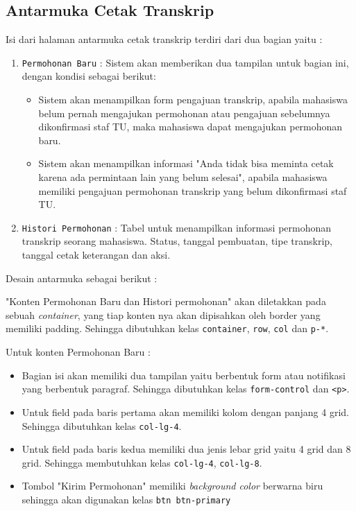 \subsection{Antarmuka Cetak Transkrip}
Isi dari halaman antarmuka cetak transkrip terdiri dari dua bagian yaitu :
\begin{enumerate}
	\item \verb|Permohonan Baru| : Sistem akan memberikan dua tampilan untuk bagian ini, dengan kondisi sebagai berikut:
	\begin{itemize}
		\item Sistem akan menampilkan form pengajuan transkrip, apabila mahasiswa belum pernah mengajukan permohonan atau pengajuan sebelumnya  dikonfirmasi staf TU, maka mahasiswa dapat mengajukan permohonan baru.
		\item Sistem akan menampilkan informasi "Anda tidak bisa meminta cetak karena ada permintaan lain yang belum selesai", apabila mahasiswa memiliki pengajuan permohonan transkrip yang belum dikonfirmasi staf TU. 
	\end{itemize}
	\item \verb|Histori Permohonan| : Tabel untuk menampilkan informasi permohonan transkrip seorang mahasiswa. Status, tanggal pembuatan, tipe transkrip, tanggal cetak keterangan dan aksi. 
\end{enumerate}
Desain antarmuka sebagai berikut : \par
"Konten Permohonan Baru dan Histori permohonan" akan diletakkan pada sebuah \textit{container}, yang tiap konten nya akan dipisahkan oleh border yang memiliki padding. Sehingga dibutuhkan kelas \verb|container|, \verb|row|, \verb|col| dan \verb|p-*|. \par
Untuk konten Permohonan Baru :
\begin{itemize}
	\item Bagian isi akan memiliki dua tampilan yaitu berbentuk form atau notifikasi yang berbentuk paragraf. Sehingga dibutuhkan kelas \verb|form-control| dan \verb|<p>|.
	\item Untuk field pada baris pertama akan memiliki kolom dengan panjang 4 grid. Sehingga dibutuhkan kelas \verb|col-lg-4|.
	\item Untuk field pada baris kedua memiliki dua jenis lebar grid yaitu 4 grid dan 8 grid. Sehingga membutuhkan kelas \verb|col-lg-4|, \verb|col-lg-8|.
	\item Tombol "Kirim Permohonan" memiliki \textit{background color} berwarna biru sehingga akan digunakan kelas \verb|btn btn-primary|
\end{itemize}
